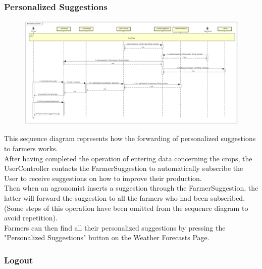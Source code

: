 \newpage
\subsubsection{Personalized Suggestions}

\begin{figure}[H]
    \begin{center}
        \includegraphics[width=\textwidth]{Images/SequenceDiagrams/Publish-SubscribeDD.png}
    \end{center}
\end{figure}

This sequence diagram represents how the forwarding of personalized suggestions to farmers works.\\
After having completed the operation of entering data concerning the crops, the UserController contacts 
the FarmerSuggestion to automatically subscribe the User to receive suggestions on how to improve their production.\\
Then when an agronomist inserts a suggestion through the FarmerSuggestion, the latter will 
forward the suggestion to all the farmers who had been subscribed. (Some steps of this operation have been omitted from the sequence diagram to avoid repetition).\\
Farmers can then find all their personalized suggestions by pressing the "Personalized Suggestions" button on the Weather Forecasts Page.


\newpage
\subsubsection{Logout}

